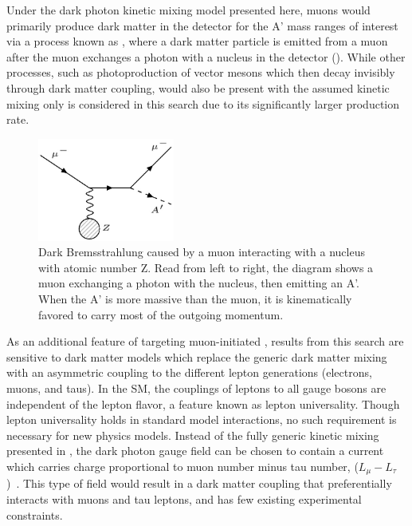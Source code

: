 Under the dark photon kinetic mixing model presented here, muons would primarily produce dark matter in the detector for the A' mass ranges of interest via a process known as \dbrem, where a dark matter particle is emitted from a muon after the muon exchanges a photon with a nucleus in the detector ().
While other processes, such as photoproduction of vector mesons which then decay invisibly through dark matter coupling, would also be present with the assumed kinetic mixing only \dbrem is considered in this search due to its significantly larger production rate.

\begin{figure}[ht]
	\centering
	\includegraphics[width=0.4\textwidth]{figures/dbrem_feyn_diagram.jpg}
        \caption[Dark Bremsstrahlung Feynman Diagram]{Dark Bremsstrahlung caused by a muon interacting with a nucleus with atomic number Z. Read from left to right, the diagram shows a muon exchanging a photon with the nucleus, then emitting an A'. When the A' is more massive than the muon, it is kinematically favored to carry most of the outgoing momentum.}
	\label{fig:dbrem_feyn}
\end{figure}

As an additional feature of targeting muon-initiated \dbrem, results from this search are sensitive to dark matter models which replace the generic dark matter mixing with an asymmetric coupling to the different lepton generations (electrons, muons, and taus).
In the SM, the couplings of leptons to all gauge bosons are independent of the lepton flavor, a feature known as lepton universality.
Though lepton universality holds in standard model interactions, no such requirement is necessary for new physics models. 
Instead of the fully generic kinetic mixing presented in , the dark photon gauge field can be chosen to contain a current which carries charge proportional to muon number minus tau number, ($L_\mu - L_\tau$)~\cite{neut_trident}.
This type of field would result in a dark matter coupling that preferentially interacts with muons and tau leptons, and has few existing experimental constraints.

